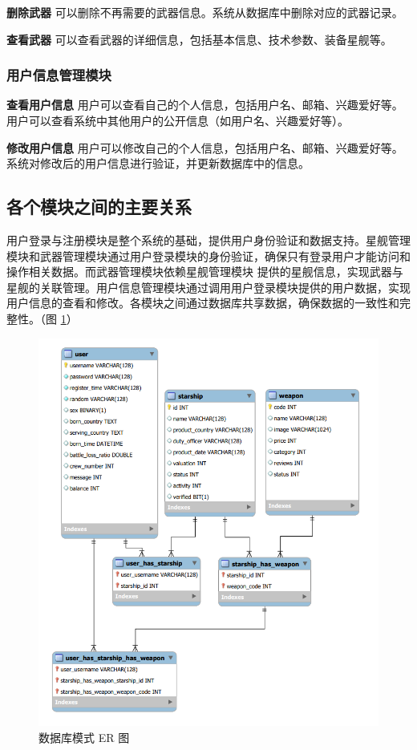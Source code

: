 \documentclass{base}
\begin{document}
\textbf{删除武器} 可以删除不再需要的武器信息。系统从数据库中删除对应的武器记录。

\textbf{查看武器} 可以查看武器的详细信息，包括基本信息、技术参数、装备星舰等。

\subsubsection{用户信息管理模块}
\textbf{查看用户信息} 用户可以查看自己的个人信息，包括用户名、邮箱、兴趣爱好等。用户可以查看系统中其他用户的公开信息（如用户名、兴趣爱好等）。

\textbf{修改用户信息} 用户可以修改自己的个人信息，包括用户名、邮箱、兴趣爱好等。系统对修改后的用户信息进行验证，并更新数据库中的信息。

\subsection{各个模块之间的主要关系}

用户登录与注册模块是整个系统的基础，提供用户身份验证和数据支持。星舰管理模块和武器管理模块通过用户登录模块的身份验证，确保只有登录用户才能访问和操作相关数据。而武器管理模块依赖星舰管理模块 提供的星舰信息，实现武器与星舰的关联管理。用户信息管理模块通过调用用户登录模块提供的用户数据，实现用户信息的查看和修改。各模块之间通过数据库共享数据，确保数据的一致性和完整性。（图 \ref{fig:databaseschema}）

\begin{figure}
	\centering
	\includegraphics[width=\linewidth]{images/DatabaseSchema}
	\caption{数据库模式 ER 图}
	\label{fig:databaseschema}
\end{figure}
\end{document}
